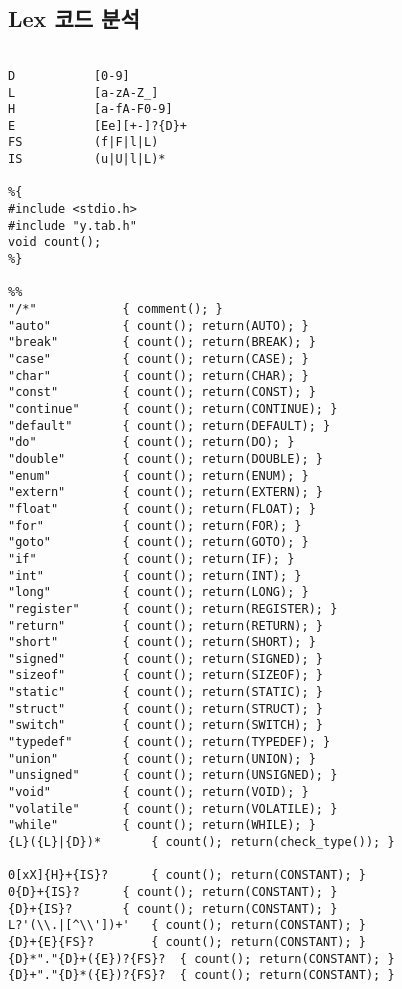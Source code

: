 \documentclass{article}
\begin{document}
\subsection{Lex 코드 분석}
\begin{lstlisting}

D			[0-9]
L			[a-zA-Z_]
H			[a-fA-F0-9]
E			[Ee][+-]?{D}+
FS			(f|F|l|L)
IS			(u|U|l|L)*

%{
#include <stdio.h>
#include "y.tab.h"
void count();
%}

%%
"/*"			{ comment(); }
"auto"			{ count(); return(AUTO); }
"break"			{ count(); return(BREAK); }
"case"			{ count(); return(CASE); }
"char"			{ count(); return(CHAR); }
"const"			{ count(); return(CONST); }
"continue"		{ count(); return(CONTINUE); }
"default"		{ count(); return(DEFAULT); }
"do"			{ count(); return(DO); }
"double"		{ count(); return(DOUBLE); }
"enum"			{ count(); return(ENUM); }
"extern"		{ count(); return(EXTERN); }
"float"			{ count(); return(FLOAT); }
"for"			{ count(); return(FOR); }
"goto"			{ count(); return(GOTO); }
"if"			{ count(); return(IF); }
"int"			{ count(); return(INT); }
"long"			{ count(); return(LONG); }
"register"		{ count(); return(REGISTER); }
"return"		{ count(); return(RETURN); }
"short"			{ count(); return(SHORT); }
"signed"		{ count(); return(SIGNED); }
"sizeof"		{ count(); return(SIZEOF); }
"static"		{ count(); return(STATIC); }
"struct"		{ count(); return(STRUCT); }
"switch"		{ count(); return(SWITCH); }
"typedef"		{ count(); return(TYPEDEF); }
"union"			{ count(); return(UNION); }
"unsigned"		{ count(); return(UNSIGNED); }
"void"			{ count(); return(VOID); }
"volatile"		{ count(); return(VOLATILE); }
"while"			{ count(); return(WHILE); }
{L}({L}|{D})*		{ count(); return(check_type()); }

0[xX]{H}+{IS}?		{ count(); return(CONSTANT); }
0{D}+{IS}?		{ count(); return(CONSTANT); }
{D}+{IS}?		{ count(); return(CONSTANT); }
L?'(\\.|[^\\'])+'	{ count(); return(CONSTANT); }
{D}+{E}{FS}?		{ count(); return(CONSTANT); }
{D}*"."{D}+({E})?{FS}?	{ count(); return(CONSTANT); }
{D}+"."{D}*({E})?{FS}?	{ count(); return(CONSTANT); }


\end{lstlisting}
\end{document}
